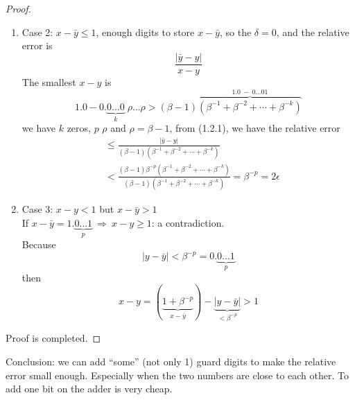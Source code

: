 \begin{proof}
\begin{enumerate}[label=$\arabic*^\circ$]
        \begin{align*}
            \frac{|\bar{y} - y - \delta|}{x-y} &\leq \frac{|\bar{y} - y - \delta|}{1} \\
            &\leq \beta^{-p} [(\beta - 1)(\beta^{-1} + \beta^{-2} + \cdots + \beta^{-k}) + \beta/2] \\
            &= \beta^{-p} [(\beta - 1)\beta^{-k}(1 + \cdots + \beta^{k-1}) + \beta/2] \\
            &= \beta^{-p} [(\beta - 1)\beta^{-k} \cdot \frac{\beta^{k} - 1}{\beta - 1} + \beta/2] \\
            &= \beta^{-p} [(1-\beta^{-k}) + \beta/2] \\
            &< \beta^{-p} [1 + \beta/2] \leq 2\epsilon
        \end{align*}
        \item Case 2: $x - \bar{y} \leq 1$, enough digits to store $x - \bar{y}$, so the $\delta = 0$, and the relative error is \[
            \frac{|\bar{y} - y|}{x-y}
        \]
        The smallest $x-y$ is \[
            1.0 - 0.\underbrace{0\ldots0}_{k}\;\rho\ldots\rho > (\beta - 1)\overbrace{(\beta^{-1} + \beta^{-2} + \cdots + \beta^{-k})}^{1.0\ -\ 0\ldots01 }
        \]
        we have $k$ zeros, $p$ $\rho$ and $\rho = \beta - 1$, from (1.2.1), we have the relative error \begin{align*}
            &\leq \frac{|\bar{y} - y|}{(\beta - 1)(\beta^{-1} + \beta^{-2} + \cdots + \beta^{-k})} \\ &< \frac{(\beta - 1)\beta^{-p}(\beta^{-1} + \beta^{-2} + \cdots + \beta^{-k})}{(\beta - 1)(\beta^{-1} + \beta^{-2} + \cdots + \beta^{-k})} = \beta^{-p} = 2\epsilon
        \end{align*}
        \item Case 3: $x-y < 1$ but $x - \bar{y} > 1$ \\
        If $x - \bar{y} = 1.\underbrace{0\ldots1}_{p}\ \Rightarrow \ x - y \geq 1$: a contradiction. \\
        Because \[
            |y - \bar{y}| < \beta^{-p} = 0. \underbrace{0\ldots1}_{p}
        \] 
        then \[
            x - y = (\underbrace{1 + \beta^{-p}}_{x-\bar{y}}) - \underbrace{|y - \bar{y}|}_{< \beta^{-p}} > 1
        \]
    \end{enumerate}
    Proof is completed.
\end{proof}

\vspace{1em}

Conclusion: we can add ``some'' (not only 1) guard digits to make the relative error small enough. Especially when the two numbers are close to each other. To add one bit on the adder is very cheap.